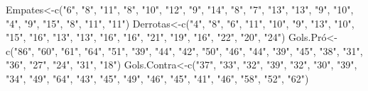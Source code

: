 \documentclass[
]{book}
\newenvironment{Shaded}{\begin{snugshade}}{\end{snugshade}}
\newcommand{\FunctionTok}[1]{\textcolor[rgb]{0.00,0.00,0.00}{#1}}
\newcommand{\NormalTok}[1]{#1}
\newcommand{\OtherTok}[1]{\textcolor[rgb]{0.56,0.35,0.01}{#1}}
\newcommand{\StringTok}[1]{\textcolor[rgb]{0.31,0.60,0.02}{#1}}
\begin{document}
\begin{Shaded}
\begin{Highlighting}[]
\NormalTok{Empates}\OtherTok{\textless{}{-}}\FunctionTok{c}\NormalTok{(}\StringTok{"6"}\NormalTok{, }\StringTok{"8"}\NormalTok{,    }\StringTok{"11"}\NormalTok{,   }\StringTok{"8"}\NormalTok{,    }\StringTok{"10"}\NormalTok{,   }\StringTok{"12"}\NormalTok{,   }\StringTok{"9"}\NormalTok{,    }\StringTok{"14"}\NormalTok{,   }\StringTok{"8"}\NormalTok{,    }\StringTok{"7"}\NormalTok{,    }\StringTok{"13"}\NormalTok{,   }\StringTok{"13"}\NormalTok{,   }\StringTok{"9"}\NormalTok{,    }\StringTok{"10"}\NormalTok{,   }\StringTok{"4"}\NormalTok{,    }\StringTok{"9"}\NormalTok{,    }\StringTok{"15"}\NormalTok{,   }\StringTok{"8"}\NormalTok{,    }\StringTok{"11"}\NormalTok{,   }\StringTok{"11"}\NormalTok{)}
\NormalTok{Derrotas}\OtherTok{\textless{}{-}}\FunctionTok{c}\NormalTok{(}\StringTok{"4"}\NormalTok{,    }\StringTok{"8"}\NormalTok{,    }\StringTok{"6"}\NormalTok{,    }\StringTok{"11"}\NormalTok{,   }\StringTok{"10"}\NormalTok{,   }\StringTok{"9"}\NormalTok{,    }\StringTok{"13"}\NormalTok{,   }\StringTok{"10"}\NormalTok{,   }\StringTok{"15"}\NormalTok{,   }\StringTok{"16"}\NormalTok{,   }\StringTok{"13"}\NormalTok{,   }\StringTok{"13"}\NormalTok{,   }\StringTok{"16"}\NormalTok{,   }\StringTok{"16"}\NormalTok{,   }\StringTok{"21"}\NormalTok{,   }\StringTok{"19"}\NormalTok{,   }\StringTok{"16"}\NormalTok{,   }\StringTok{"22"}\NormalTok{,   }\StringTok{"20"}\NormalTok{,   }\StringTok{"24"}\NormalTok{)}
\NormalTok{Gols.Pró}\OtherTok{\textless{}{-}}\FunctionTok{c}\NormalTok{(}\StringTok{"86"}\NormalTok{,   }\StringTok{"60"}\NormalTok{,   }\StringTok{"61"}\NormalTok{,   }\StringTok{"64"}\NormalTok{,   }\StringTok{"51"}\NormalTok{,   }\StringTok{"39"}\NormalTok{,   }\StringTok{"44"}\NormalTok{,   }\StringTok{"42"}\NormalTok{,   }\StringTok{"50"}\NormalTok{,   }\StringTok{"46"}\NormalTok{,   }\StringTok{"44"}\NormalTok{,   }\StringTok{"39"}\NormalTok{,   }\StringTok{"45"}\NormalTok{,   }\StringTok{"38"}\NormalTok{,   }\StringTok{"31"}\NormalTok{,   }\StringTok{"36"}\NormalTok{,   }\StringTok{"27"}\NormalTok{,   }\StringTok{"24"}\NormalTok{,   }\StringTok{"31"}\NormalTok{,   }\StringTok{"18"}\NormalTok{)}
\NormalTok{Gols.Contra}\OtherTok{\textless{}{-}}\FunctionTok{c}\NormalTok{(}\StringTok{"37"}\NormalTok{,    }\StringTok{"33"}\NormalTok{,   }\StringTok{"32"}\NormalTok{,   }\StringTok{"39"}\NormalTok{,   }\StringTok{"32"}\NormalTok{,   }\StringTok{"30"}\NormalTok{,   }\StringTok{"39"}\NormalTok{,   }\StringTok{"34"}\NormalTok{,   }\StringTok{"49"}\NormalTok{,   }\StringTok{"64"}\NormalTok{,   }\StringTok{"43"}\NormalTok{,   }\StringTok{"45"}\NormalTok{,   }\StringTok{"49"}\NormalTok{,   }\StringTok{"46"}\NormalTok{,   }\StringTok{"45"}\NormalTok{,   }\StringTok{"41"}\NormalTok{,   }\StringTok{"46"}\NormalTok{,   }\StringTok{"58"}\NormalTok{,   }\StringTok{"52"}\NormalTok{,   }\StringTok{"62"}\NormalTok{)}

\end{Highlighting}
\end{Shaded}
\end{document}
